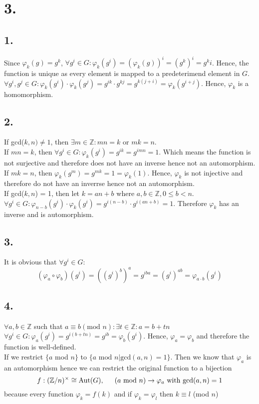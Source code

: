 \documentclass[11pt]{article}
\begin{document}
\pagebreak
\section*{3.}
\subsection*{1.}
Since $\varphi_k(g) = g^k$, $\forall g^i \in G: \varphi_k(g^i) = (\varphi_k(g))^i = (g^k)^i = g^ki$.
Hence, the function is unique as every element is mapped to a predeterimend element in $G$. 
$\forall g^i, g^j \in G: \varphi_k(g^i) \cdot \varphi_k(g^j) = g^{ik} \cdot g^{kj} = g^{k(j+i)} = \varphi_k(g^{i+j})$. Hence, $\varphi_k$ is a homomorphism.
\subsection*{2.}
If gcd($k,n) \ne 1$, then $\exists m \in \mathbb{Z}: mn = k$ or $mk = n$. \\
If $mn = k$, then $\forall g^i \in G:\varphi_k(g^i) = g^{ik} = g^{imn} = 1$. Which means the function is not surjective and therefore does not have an inverse hence not an automorphism. \\
If $mk = n$, then $\varphi_k(g^m) = g^{mk} = 1 = \varphi_k(1)$. Hence, $\varphi_k$ is not injective and therefore do not have an inverrse hence not an automorphism. \\
If gcd($k,n$) = 1, then let $k = an + b$ where $a,b \in \mathbb{Z}, 0\le b < n$. \\
$\forall g^i \in G: \varphi_{n-b} (g^i) \cdot \varphi_k(g^i) = g^{i(n-b)} \cdot g^{i(an+b)} = 1$. Therefore $\varphi_k$ has an inverse and is automorphism. 
\subsection*{3.}
It is obvious that $\forall g^i \in G:$
\[
(\varphi_a \circ \varphi_b) (g^i) = ((g^i)^b)^a = g^{iba} = (g^i)^{ab} = \varphi_{a\cdot b}(g^i) 
\]
\subsection*{4.}
$\forall a,b \in \mathbb{Z}$ such that $ a \equiv b (\text{mod } n): \exists t \in \mathbb{Z}: a = b + tn$ \\
$\forall g^i \in G: \varphi_a(g^i) = g^{i(b+tn)} = g^{ib} = \varphi_b(g^i)$. Hence, $\varphi_a = \varphi_b$ and therefore the function is well-defined. \\
If we restrict $\{a$ mod $n \}$ to $\{a \text{ mod } n | \text{gcd}(a,n) = 1 \}$. Then we know that $\varphi_a$ is an automorphism hence we can restrict the original function to a bijection 
\[
f: (\mathbb{Z} / n)^\times \cong \text{Aut}(G), \indent (a \text{ mod }  n ) \to \varphi_a \text{ with gcd} (a,n) = 1
\] 
because every function $\varphi_k = f(k)$ and if $\varphi_k = \varphi_l$ then $k \equiv l$ (mod $n$) 	
\end{document}
